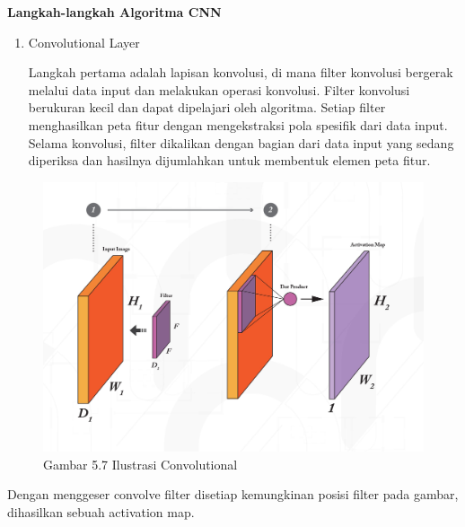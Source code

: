\documentclass[
  letterpaper,
  DIV=11,
  numbers=noendperiod]{scrreprt}
\begin{document}
\textbf{Langkah-langkah Algoritma CNN}

\begin{enumerate}
\def\labelenumi{\alph{enumi})}
\item
  Convolutional Layer

  Langkah pertama adalah lapisan konvolusi, di mana filter konvolusi
  bergerak melalui data input dan melakukan operasi konvolusi. Filter
  konvolusi berukuran kecil dan dapat dipelajari oleh algoritma. Setiap
  filter menghasilkan peta fitur dengan mengekstraksi pola spesifik dari
  data input. Selama konvolusi, filter dikalikan dengan bagian dari data
  input yang sedang diperiksa dan hasilnya dijumlahkan untuk membentuk
  elemen peta fitur.
\end{enumerate}

\begin{figure}

{\centering \includegraphics{Asset/convolutional.jpeg}

}

\caption{Gambar 5.7 Ilustrasi Convolutional}

\end{figure}

Dengan menggeser convolve filter disetiap kemungkinan posisi filter pada
gambar, dihasilkan sebuah activation map.
\end{document}
